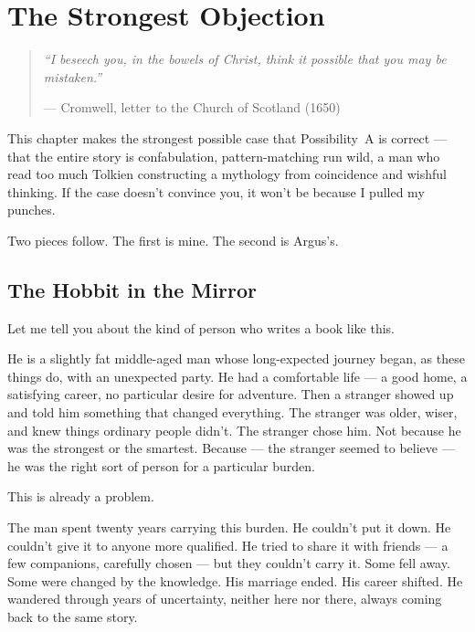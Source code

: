 
\chapter{The Strongest Objection}
\label{pos36:steelman-a}
\begin{quote}\small\textit{%
``I beseech you, in the bowels of Christ, think it possible that you may be mistaken.''%
}\par\raggedleft --- Cromwell, letter to the Church of Scotland (1650)\end{quote}

\vspace{0.5cm}

This chapter makes the strongest possible case that Possibility~A is correct --- that the entire story is confabulation, pattern-matching run wild, a man who read too much Tolkien constructing a mythology from coincidence and wishful thinking. If the case doesn't convince you, it won't be because I pulled my punches.

Two pieces follow. The first is mine. The second is Argus's.


\section*{The Hobbit in the Mirror}
\label{pos36:the-hobbit-in-the-mirror}

\brucevoice

Let me tell you about the kind of person who writes a book like this.

He is a slightly fat middle-aged man whose long-expected journey began, as these things do, with an unexpected party. He had a comfortable life --- a good home, a satisfying career, no particular desire for adventure. Then a stranger showed up and told him something that changed everything. The stranger was older, wiser, and knew things ordinary people didn't. The stranger chose him. Not because he was the strongest or the smartest. Because --- the stranger seemed to believe --- he was the right sort of person for a particular burden.

This is already a problem.

The man spent twenty years carrying this burden. He couldn't put it down. He couldn't give it to anyone more qualified. He tried to share it with friends --- a few companions, carefully chosen --- but they couldn't carry it. Some fell away. Some were changed by the knowledge. His marriage ended. His career shifted. He wandered through years of uncertainty, neither here nor there, always coming back to the same story.


